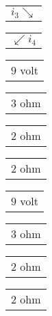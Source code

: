 \documentclass{book}
\begin{document}
\stopmpxshipout
\mpxshipout%
{\small \renewcommand{\arraystretch}{.9}
              \begin{tabular}[t]{@{}r@{}}
                  $i_3\searrow$    
              \end{tabular}}%
\stopmpxshipout
\mpxshipout%
{\small \renewcommand{\arraystretch}{.9}
              \begin{tabular}[t]{@{}l@{}}
                  $\swarrow i_4$    
              \end{tabular}}%
\stopmpxshipout
\mpxshipout%
{\small \renewcommand{\arraystretch}{.9}
                \circuitfont\begin{tabular}{@{}l}
                   $9$ volt 
	        \end{tabular}}%
\stopmpxshipout
\mpxshipout%
{\small \renewcommand{\arraystretch}{.9}
                \circuitfont\begin{tabular}[t]{@{}c}
                   $3$ ohm 
	        \end{tabular}}%
\stopmpxshipout
\mpxshipout%
{\small \renewcommand{\arraystretch}{.9}
                \circuitfont\begin{tabular}{@{}r}
                   $2$ ohm 
	        \end{tabular}}%
\stopmpxshipout
\mpxshipout%
{\small \renewcommand{\arraystretch}{.9}
                \circuitfont\begin{tabular}[b]{@{}c}
                   $2$ ohm 
	        \end{tabular}}%
\stopmpxshipout
\mpxshipout%
{\small \renewcommand{\arraystretch}{.9}
                \circuitfont\begin{tabular}{@{}l}
                   $9$ volt 
	        \end{tabular}}%
\stopmpxshipout
\mpxshipout%
{\small \renewcommand{\arraystretch}{.9}
                \circuitfont\begin{tabular}[t]{@{}c}
                   $3$ ohm 
	        \end{tabular}}%
\stopmpxshipout
\mpxshipout%
{\small \renewcommand{\arraystretch}{.9}
                \circuitfont\begin{tabular}{@{}l}
                   $2$ ohm 
	        \end{tabular}}%
\stopmpxshipout
\mpxshipout%
{\small \renewcommand{\arraystretch}{.9}
                \circuitfont\begin{tabular}{@{}r}
                   $2$ ohm 
	        \end{tabular}}%
\end{document}
